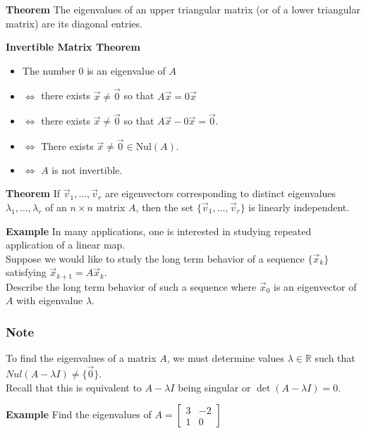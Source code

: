   \begin{frame}[fragile]
 \textbf{Theorem}
 The eigenvalues of an upper triangular matrix (or of a lower triangular matrix) are its
diagonal entries. 



\textbf{Invertible Matrix Theorem}
 \begin{itemize}
 \item[] The number 0 is an eigenvalue of $A$   
\item[] $\iff$  there exists $\vec{x} \neq \vec{0}$ so that 
$A \vec{x} = 0 \vec{x}$  
\item[] $\iff$   there exists $\vec{x} \neq \vec{0}$ so that 
$A \vec{x} - 0 \vec{x} = \vec{0}$.
\item[] $\iff$  There exists $\vec{x} \neq \vec{0} \in \text{Nul}(A)$.
\item[] $\iff$  $A$ is not invertible. 
\end{itemize}



\textbf{Theorem}
 If $\vec{v}_1, \dots, \vec{v}_r$ are eigenvectors corresponding to 
distinct eigenvalues $\lambda_1, \dots, \lambda_r$ of an $n\times n$ matrix $A$,
then the set $\{\vec{v}_1, \dots,\vec{v}_r\}$ is linearly independent.

\end{frame}




  \begin{frame}[fragile]
\textbf{Example}
In many applications, one is interested in studying repeated application of a linear map.  \\ 
Suppose we would like to study the long term behavior of a sequence $\{\vec{x}_k\}$ satisfying $\vec{x}_{k+1}=A\vec{x}_k$. \\ 
Describe the long term behavior of such a sequence where $\vec{x}_0$ is an eigenvector of $A$ with eigenvalue $\lambda$. \\ 

\end{frame}


\begin{frame}[fragile]\frametitle{Note}

To find the eigenvalues of a matrix $A$, we must determine values $\lambda\in  \mathbb R$ such that $Nul(A-\lambda I)\neq\{\vec{0}\}$.  \\
Recall that this is equivalent to $A-\lambda I$ being singular  or $\det(A-\lambda I)=0$.

\textbf{Example}
Find the eigenvalues of 
$A = \left[ \begin{array}{rrrrr} 3 & -2 \\ 1 & 0 \end{array} \right]$
\end{frame}

